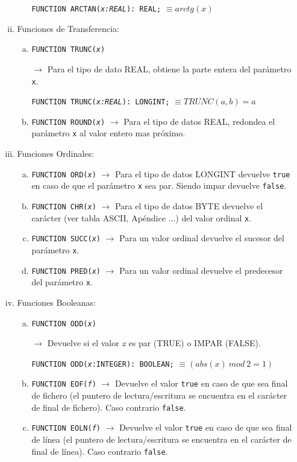 \begin{enumerate}[I.]
\begin{enumerate}[i.]
\begin{enumerate}[a.]
{\form \texttt{FUNCTION ARCTAN(\textit{x:REAL}): REAL;} $\equiv arctg(x)$
}
\end{enumerate}

\item {}Funciones de Transferencia:

\begin{enumerate}[a.]
\item \texttt{FUNCTION TRUNC(\textit{x})}{ $\rightarrow$ Para el tipo de dato
REAL, obtiene la parte entera del parámetro \texttt{x}.

\form \texttt{FUNCTION TRUNC(\textit{x:REAL}): LONGINT;} $\equiv TRUNC(a,b) = a$
}
\item \texttt{FUNCTION ROUND(\textit{x})} $\rightarrow$ Para el tipo de datos
REAL, redondea el parámetro \texttt{x} al valor entero mas próximo.

\end{enumerate}

\item {}Funciones Ordinales:

\begin{enumerate}[a.]
\item \texttt{FUNCTION ORD(\textit{x})} $\rightarrow$ Para el tipo de datos
LONGINT devuelve \texttt{true} en caso de que el parámetro \texttt{x} sea par.
Siendo impar devuelve \texttt{false}.
\item \texttt{FUNCTION CHR(\textit{x})} $\rightarrow$ Para el tipo de datos BYTE
devuelve el carácter (ver tabla ASCII, Apéndice ...) del valor ordinal
\texttt{x}. 
\item \texttt{FUNCTION SUCC(\textit{x})} $\rightarrow$ Para un valor ordinal
devuelve el sucesor del parámetro \texttt{x}.
\item \texttt{FUNCTION PRED(\textit{x})}  $\rightarrow$ Para un valor ordinal
devuelve el predecesor del parámetro \texttt{x}.
\end{enumerate}

\item {}Funciones Booleanas:

\begin{enumerate}[a.]
\item \texttt{FUNCTION ODD(\textit{x})}{ $\rightarrow$ Devuelve si el valor \textit{x} es par (TRUE) o IMPAR (FALSE).

\form \texttt{FUNCTION ODD(\textit{x}:INTEGER): BOOLEAN;} $\equiv (abs(x)\ mod\ 2 = 1)$
}

\item \texttt{FUNCTION EOF(\textit{f})} $\rightarrow$ Devuelve el valor
\texttt{true} en caso de que sea final de fichero (el puntero de
lectura/escritura se encuentra en el carácter de final de fichero). Caso
contrario \texttt{false}.  
\item \texttt{FUNCTION EOLN(\textit{f})} $\rightarrow$ Devuelve el valor
\texttt{true} en caso de que sea final de línea (el puntero de lectura/escritura
se encuentra en el carácter de final de línea). Caso contrario \texttt{false}. 
\end{enumerate}


\end{enumerate}
\end{enumerate}

